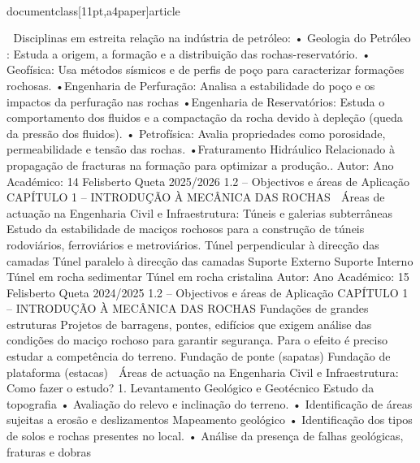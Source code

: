 \\documentclass[11pt,a4paper]{article}
\begin{document}
 Disciplinas em estreita relação na indústria de petróleo:
• Geologia do Petróleo : Estuda a origem, a formação e a distribuição das rochas-reservatório.
• Geofísica: Usa métodos sísmicos e de perfis de poço para caracterizar formações rochosas.
•Engenharia de
Perfuração:
Analisa a estabilidade do poço e os impactos da perfuração nas rochas
•Engenharia de
Reservatórios:
Estuda o comportamento dos fluidos e a compactação da rocha devido à depleção (queda
da pressão dos fluidos).
• Petrofísica: Avalia propriedades como porosidade, permeabilidade e tensão das rochas.
•Fraturamento Hidráulico Relacionado à propagação de fracturas na formação para optimizar a produção..
Autor:
Ano Académico:
14
Felisberto Queta
2025/2026
1.2 – Objectivos e áreas de Aplicação
CAPÍTULO 1 
–
 INTRODUÇÃO À MECÂNICA DAS ROCHAS
 Áreas de actuação na Engenharia Civil e 
Infraestrutura:
Túneis e galerias
subterrâneas
Estudo da estabilidade de maciços rochosos para a construção de túneis rodoviários,
ferroviários e metroviários.
Túnel perpendicular à direcção das 
camadas
Túnel paralelo à direcção das 
camadas
Suporte Externo Suporte Interno
Túnel em rocha 
sedimentar
Túnel em rocha 
cristalina
Autor:
Ano Académico:
15
Felisberto Queta
2024/2025
1.2 – Objectivos e áreas de Aplicação
CAPÍTULO 1 
–
 INTRODUÇÃO À MECÂNICA DAS ROCHAS
Fundações de grandes estruturas
Projetos de barragens, pontes, edifícios que exigem análise
das condições do maciço rochoso para garantir segurança.
Para o efeito é preciso estudar a competência do terreno.
Fundação de ponte (sapatas) Fundação de plataforma (estacas)
 Áreas de actuação na Engenharia Civil e 
Infraestrutura:
Como fazer o estudo?
1. Levantamento Geológico e Geotécnico
Estudo da topografia
• Avaliação do relevo e inclinação do terreno.
• Identificação de áreas sujeitas a erosão e deslizamentos
Mapeamento geológico
• Identificação dos tipos de solos e rochas presentes no local.
• Análise da presença de falhas geológicas, fraturas e dobras\
\end{document}
